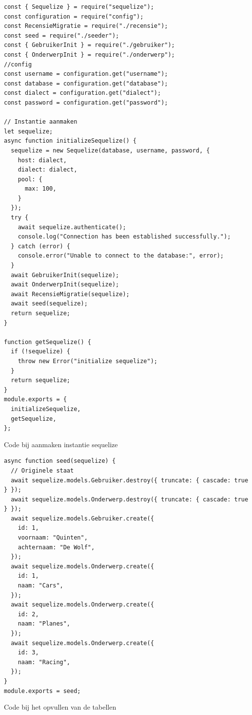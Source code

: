 \begin{listing}[H]
  \centering
  \begin{verbatim}
const { Sequelize } = require("sequelize");
const configuration = require("config");
const RecensieMigratie = require("./recensie");
const seed = require("./seeder");
const { GebruikerInit } = require("./gebruiker");
const { OnderwerpInit } = require("./onderwerp");
//config
const username = configuration.get("username");
const database = configuration.get("database");
const dialect = configuration.get("dialect");
const password = configuration.get("password");

// Instantie aanmaken
let sequelize;
async function initializeSequelize() {
  sequelize = new Sequelize(database, username, password, {
    host: dialect,
    dialect: dialect,
    pool: {
      max: 100,
    }
  });
  try {
    await sequelize.authenticate();
    console.log("Connection has been established successfully.");
  } catch (error) {
    console.error("Unable to connect to the database:", error);
  }
  await GebruikerInit(sequelize);
  await OnderwerpInit(sequelize);
  await RecensieMigratie(sequelize);
  await seed(sequelize);
  return sequelize;
}

function getSequelize() {
  if (!sequelize) {
    throw new Error("initialize sequelize");
  }
  return sequelize;
}
module.exports = {
  initializeSequelize,
  getSequelize,
};
\end{verbatim}
\caption{\label{code:Instantie}Code bij aanmaken instantie sequelize}
\end{listing}

\begin{listing}[H]
  \centering
  \begin{verbatim}
async function seed(sequelize) {
  // Originele staat
  await sequelize.models.Gebruiker.destroy({ truncate: { cascade: true } });
  await sequelize.models.Onderwerp.destroy({ truncate: { cascade: true } });
  await sequelize.models.Gebruiker.create({
    id: 1,
    voornaam: "Quinten",
    achternaam: "De Wolf",
  });
  await sequelize.models.Onderwerp.create({
    id: 1,
    naam: "Cars",
  });
  await sequelize.models.Onderwerp.create({
    id: 2,
    naam: "Planes",
  });
  await sequelize.models.Onderwerp.create({
    id: 3,
    naam: "Racing",
  });
}
module.exports = seed;
\end{verbatim}
\caption{\label{code:Seed}Code bij het opvullen van de tabellen}
\end{listing}

